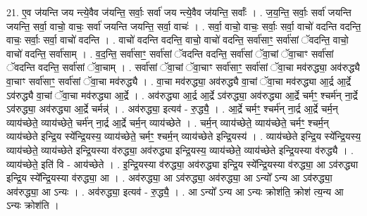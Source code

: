 \documentclass[17pt]{extarticle}
\begin{document}
21. ए॒व ज॑यन्ति जय न्त्ये॒वैव ज॑यन्ति॒ सर्वाः॒ सर्वा॑ जय न्त्ये॒वैव ज॑यन्ति॒ सर्वाः᳚ । . ज॒य॒न्ति॒ सर्वाः॒ सर्वा॑ जयन्ति जयन्ति॒ सर्वा॒ वाचो॒ वाचः॒ सर्वा॑ जयन्ति जयन्ति॒ सर्वा॒ वाचः॑ । . सर्वा॒ वाचो॒ वाचः॒ सर्वाः॒ सर्वा॒ वाचो॑ वदन्ति वदन्ति॒ वाचः॒ सर्वाः॒ सर्वा॒ वाचो॑ वदन्ति । . वाचो॑ वदन्ति वदन्ति॒ वाचो॒ वाचो॑ वदन्ति॒ सर्वा॑साꣳ॒॒ सर्वा॑सां ॅवदन्ति॒ वाचो॒ वाचो॑ वदन्ति॒ सर्वा॑साम् । . व॒द॒न्ति॒ सर्वा॑साꣳ॒॒ सर्वा॑सां ॅवदन्ति वदन्ति॒ सर्वा॑सां ॅवा॒चां ॅवा॒चाꣳ सर्वा॑सां ॅवदन्ति वदन्ति॒ सर्वा॑सां ॅवा॒चाम् । . सर्वा॑सां ॅवा॒चां ॅवा॒चाꣳ सर्वा॑साꣳ॒॒ सर्वा॑सां ॅवा॒चा मव॑रुद्ध्या॒ अव॑रुद्ध्यै वा॒चाꣳ सर्वा॑साꣳ॒॒ सर्वा॑सां ॅवा॒चा मव॑रुद्ध्यै । . वा॒चा मव॑रुद्ध्या॒ अव॑रुद्ध्यै वा॒चां ॅवा॒चा मव॑रुद्ध्या आ॒र्द्र आ॒र्द्रे ऽव॑रुद्ध्यै वा॒चां ॅवा॒चा मव॑रुद्ध्या आ॒र्द्रे । . अव॑रुद्ध्या आ॒र्द्र आ॒र्द्रे ऽव॑रुद्ध्या॒ अव॑रुद्ध्या आ॒र्द्रे चर्मꣳ॒॒ श्चर्म॑न् ना॒र्द्रे ऽव॑रुद्ध्या॒ अव॑रुद्ध्या आ॒र्द्रे चर्मन्न्॑ । . अव॑रुद्ध्या॒ इत्यव॑ - रु॒द्ध्यै॒ । . आ॒र्द्रे चर्मꣳ॒॒ श्चर्म॑न् ना॒र्द्र आ॒र्द्रे चर्म॒न् व्याय॑च्छेते॒ व्याय॑च्छेते॒ चर्म॑न् ना॒र्द्र आ॒र्द्रे चर्म॒न् व्याय॑च्छेते । . चर्म॒न् व्याय॑च्छेते॒ व्याय॑च्छेते॒ चर्मꣳ॒॒ श्चर्म॒न् व्याय॑च्छेते इन्द्रि॒य स्ये᳚न्द्रि॒यस्य॒ व्याय॑च्छेते॒ चर्मꣳ॒॒ श्चर्म॒न् व्याय॑च्छेते इन्द्रि॒यस्य॑ । . व्याय॑च्छेते इन्द्रि॒य स्ये᳚न्द्रि॒यस्य॒ व्याय॑च्छेते॒ व्याय॑च्छेते इन्द्रि॒यस्या व॑रुद्ध्या॒ अव॑रुद्ध्या इन्द्रि॒यस्य॒ व्याय॑च्छेते॒ व्याय॑च्छेते इन्द्रि॒यस्या व॑रुद्ध्यै । . व्याय॑च्छेते॒ इति॑ वि - आय॑च्छेते । . इ॒न्द्रि॒यस्या व॑रुद्ध्या॒ अव॑रुद्ध्या इन्द्रि॒य स्ये᳚न्द्रि॒यस्या व॑रुद्ध्या॒ आ ऽव॑रुद्ध्या इन्द्रि॒य स्ये᳚न्द्रि॒यस्या व॑रुद्ध्या॒ आ । . अव॑रुद्ध्या॒ आ ऽव॑रुद्ध्या॒ अव॑रुद्ध्या॒ आ ऽन्यो᳚ ऽन्य आ ऽव॑रुद्ध्या॒ अव॑रुद्ध्या॒ आ ऽन्यः । . अव॑रुद्ध्या॒ इत्यव॑ - रु॒द्ध्यै॒ । . आ ऽन्यो᳚ ऽन्य आ ऽन्यः क्रोश॑ति॒ क्रोश॑ त्य॒न्य आ ऽन्यः क्रोश॑ति । \newline
\end{document}
